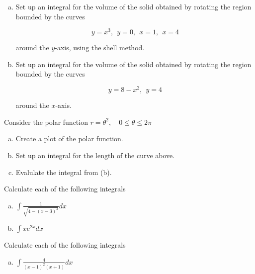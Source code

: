 \documentclass[11pt]{exam}
\theoremstyle{definition}
\begin{document}
\begin{questions}

\addpoints

\question[10]\mbox{}

\begin{enumerate}[(a)]
\item  
Set up an integral for the volume of the solid obtained by rotating the region bounded by the curves 

$$y=x^3,\ \ y=0, \ \ x = 1,\ \ x= 4$$

around the $y$-axis, using the shell method.

\vspace{3in}
\item

Set up an integral for the volume of the solid obtained by rotating the region bounded by the curves

$$y=8-x^2,\ \ y=4 $$

around the $x$-axis.


\end{enumerate}

\newpage
\question[10]\mbox{} 

Consider the polar function
$r=\theta^2,\quad 0\leq \theta\leq 2\pi$

\begin{enumerate}[(a)]
\item Create a plot of the polar function.
\vspace{3in}
\item Set up an integral for the length of the curve above.
\vspace{2in}
\item Evalulate the integral from (b).
\end{enumerate}

\newpage
\question[10]\mbox{} 

Calculate each of the following integrals

\begin{enumerate}[(a)]
\item $\int \frac{1}{\sqrt{4-(x-3)^2}}dx$

\vspace{4in}
\item $\int xe^{2x}dx$

\end{enumerate}

\newpage
\question[10]\mbox{} 

Calculate each of the following integrals

\begin{enumerate}[(a)]
\item $\int \frac{4}{(x-1)^2(x+1)}dx$


\end{enumerate}
\end{questions}
\end{document}
